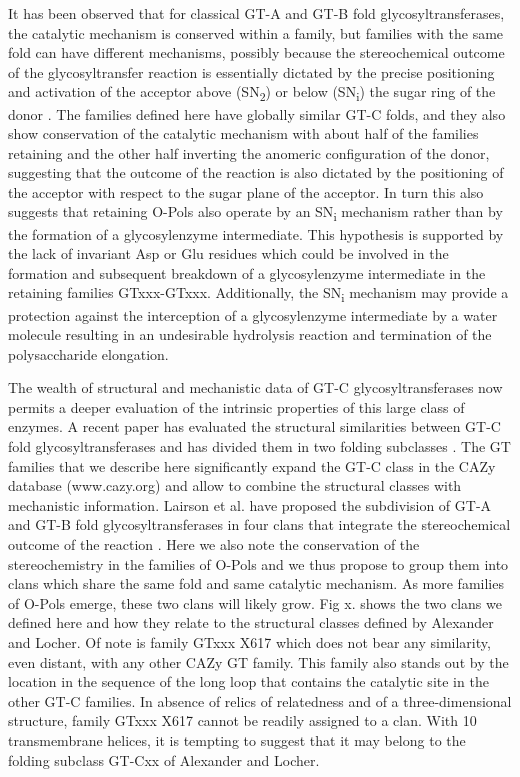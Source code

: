\documentclass{article}
\begin{document}
It has been observed that for classical GT-A and GT-B fold glycosyltransferases, the catalytic mechanism is conserved within a family, but families with the same fold can have different mechanisms, possibly because the stereochemical outcome of the glycosyltransfer reaction is essentially dictated by the precise positioning and activation of the acceptor above (SN\textsubscript{2}) or below (SN\textsubscript{i}) the sugar ring of the donor \cite{lairson_glycosyltransferases_2008}. The families defined here  have globally similar GT-C folds, and they also show conservation of the catalytic mechanism with about half of the families retaining and the other half inverting the anomeric configuration of the donor, suggesting that the outcome of the reaction is also dictated by the positioning of the acceptor with respect to the sugar plane of the acceptor. In turn this also suggests that retaining O-Pols also operate by an SN\textsubscript{i} mechanism rather than by the formation of a glycosylenzyme intermediate. This hypothesis is supported by the lack of invariant Asp or Glu residues which could be involved in the formation and subsequent breakdown of a glycosylenzyme intermediate in the retaining families GTxxx-GTxxx. Additionally, the  SN\textsubscript{i} mechanism may provide a protection against the interception of a glycosylenzyme intermediate by a water molecule resulting in an undesirable hydrolysis reaction and termination of the polysaccharide elongation. 

The wealth of structural and mechanistic data of GT-C glycosyltransferases now permits a deeper evaluation of the intrinsic properties of this large class of enzymes. A recent paper has evaluated the structural similarities between GT-C fold glycosyltransferases and has divided them in two folding subclasses \cite{alexander_emerging_2023}. The GT families that we describe here significantly expand the GT-C class in the CAZy database (www.cazy.org) and allow to combine the structural classes with mechanistic information.  Lairson et al. have proposed the subdivision of GT-A and GT-B fold glycosyltransferases in four clans that integrate the stereochemical outcome of the reaction \cite{lairson_glycosyltransferases_2008}. Here we also note  the  conservation of the stereochemistry in the families of O-Pols and we thus propose to group them into clans which share the same fold and same catalytic mechanism. As more families of O-Pols emerge, these two clans will likely grow. Fig x. shows the two clans we defined here and how they relate to the structural classes defined by Alexander and Locher. Of note is family GTxxx X617 which does not bear any similarity, even distant, with any other CAZy GT family. This family also stands out by the location in the sequence of the long loop that contains the catalytic site in the other GT-C families. In absence of relics of relatedness and of a three-dimensional structure, family GTxxx X617 cannot be readily assigned  to a clan. With 10 transmembrane helices, it is tempting to suggest that it may belong to the folding subclass GT-Cxx of Alexander and Locher. 
\end{document}
